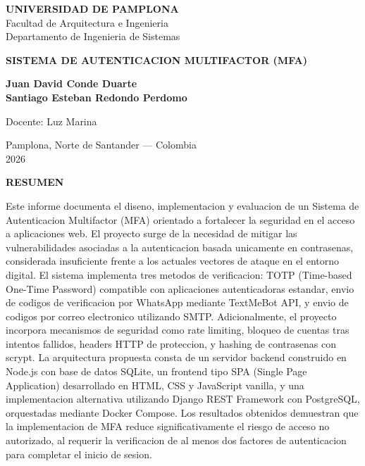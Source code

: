 \documentclass[12pt,a4paper]{article}
\begin{document}
\thispagestyle{empty}
\begin{center}
\vspace*{1in}

{\normalsize\textbf{UNIVERSIDAD DE PAMPLONA}}\\[0.2cm]
{\normalsize Facultad de Arquitectura e Ingenieria}\\[0.2cm]
{\normalsize Departamento de Ingenieria de Sistemas}

\vspace{1in}

{\normalsize\textbf{SISTEMA DE AUTENTICACION MULTIFACTOR (MFA)}}

\vspace{1in}

{\normalsize\textbf{Juan David Conde Duarte}}\\[0.2cm]
{\normalsize\textbf{Santiago Esteban Redondo Perdomo}}

\vspace{1in}

{\normalsize Docente: Luz Marina}

\vspace{1in}

{\normalsize Pamplona, Norte de Santander --- Colombia}\\[0.2cm]
{\normalsize 2026}

\end{center}

\newpage
\thispagestyle{empty}
\begin{center}
{\normalsize\textbf{RESUMEN}}
\end{center}

\vspace{0.5cm}

{\small Este informe documenta el diseno, implementacion y evaluacion de un Sistema de Autenticacion Multifactor (MFA) orientado a fortalecer la seguridad en el acceso a aplicaciones web. El proyecto surge de la necesidad de mitigar las vulnerabilidades asociadas a la autenticacion basada unicamente en contrasenas, considerada insuficiente frente a los actuales vectores de ataque en el entorno digital. El sistema implementa tres metodos de verificacion: TOTP (Time-based One-Time Password) compatible con aplicaciones autenticadoras estandar, envio de codigos de verificacion por WhatsApp mediante TextMeBot API, y envio de codigos por correo electronico utilizando SMTP. Adicionalmente, el proyecto incorpora mecanismos de seguridad como rate limiting, bloqueo de cuentas tras intentos fallidos, headers HTTP de proteccion, y hashing de contrasenas con scrypt. La arquitectura propuesta consta de un servidor backend construido en Node.js con base de datos SQLite, un frontend tipo SPA (Single Page Application) desarrollado en HTML, CSS y JavaScript vanilla, y una implementacion alternativa utilizando Django REST Framework con PostgreSQL, orquestadas mediante Docker Compose. Los resultados obtenidos demuestran que la implementacion de MFA reduce significativamente el riesgo de acceso no autorizado, al requerir la verificacion de al menos dos factores de autenticacion para completar el inicio de sesion.}
\end{document}
